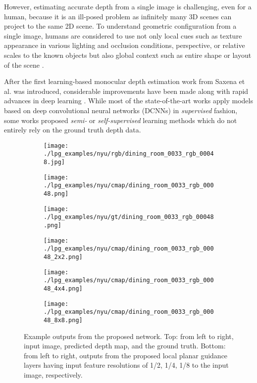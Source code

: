 \documentclass[10pt,twocolumn,letterpaper]{article}
\begin{document}
However, estimating accurate depth from a single image is challenging, even for a human, because it is an ill-posed problem as infinitely many 3D scenes can project to the same 2D scene.
To understand geometric configuration from a single image, humans are considered to use not only local cues such as texture appearance in various lighting and occlusion conditions, perspective, or relative scales to the known objects but also global context such as entire shape or layout of the scene \cite{howard2012perceiving}.

After the first learning-based monocular depth estimation work from Saxena et al. \cite{saxena2006learning} was introduced, considerable improvements have been made along with rapid advances in deep learning \cite{eigen2014depth,eigen2015predicting,li2017two,liu2016learning,wang2015towards,roy2016monocular,kim2016unified,laina2016deeper}.
While most of the state-of-the-art works apply models based on deep convolutional neural networks (DCNNs) in \textit{supervised} fashion, some works proposed \textit{semi-} \cite{kuznietsov2017semi} or \textit{self-supervised} learning methods which do not entirely rely on the ground truth depth data.

\begin{figure}
	\centering
	\smallskip
	\begin{subfigure}{.3\linewidth}
		\centering
		\texttt{[image: ./lpg\_examples/nyu/rgb/dining\_room\_0033\_rgb\_00048.jpg]}
	\end{subfigure}
	\begin{subfigure}{.3\linewidth}
		\centering
		\texttt{[image: ./lpg\_examples/nyu/cmap/dining\_room\_0033\_rgb\_00048.png]}
	\end{subfigure}
	\begin{subfigure}{.3\linewidth}
		\centering
		\texttt{[image: ./lpg\_examples/nyu/gt/dining\_room\_0033\_rgb\_00048.png]}
	\end{subfigure}	
	
	\vspace{0.1cm}
	
	\begin{subfigure}{.3\linewidth}
		\centering
		\texttt{[image: ./lpg\_examples/nyu/cmap/dining\_room\_0033\_rgb\_00048\_2x2.png]}
	\end{subfigure}
	\begin{subfigure}{.3\linewidth}
		\centering
		\texttt{[image: ./lpg\_examples/nyu/cmap/dining\_room\_0033\_rgb\_00048\_4x4.png]}
	\end{subfigure}
	\begin{subfigure}{.3\linewidth}
		\centering
		\texttt{[image: ./lpg\_examples/nyu/cmap/dining\_room\_0033\_rgb\_00048\_8x8.png]}
	\end{subfigure}
	\caption{Example outputs from the proposed network. Top: from left to right, input image, predicted depth map, and the ground truth. Bottom: from left to right, outputs from the proposed local planar guidance layers having input feature resolutions of 1/2, 1/4, 1/8 to the input image, respectively.}
	\label{fg:mde_example}
\end{figure}
\end{document}
